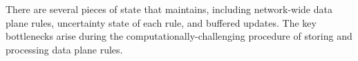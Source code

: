 % 
% 
% 

 There are several pieces of state that \name maintains, including network-wide data plane rules, uncertainty state of each rule, and buffered updates. The key bottlenecks arise during the computationally-challenging procedure of storing and processing data plane rules.




